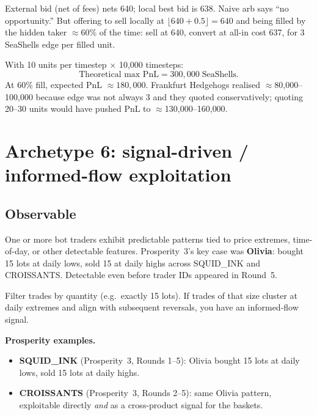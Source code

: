 \begin{prosperitybox}[title={MAGNIFICENT\_MACARONS profit arithmetic}]
External bid (net of fees) nets 640; local best bid is 638.  Naive
arb says ``no opportunity.''  But offering to sell locally at
$\lfloor 640 + 0.5 \rfloor = 640$ and being filled by the hidden
taker $\approx$60\% of the time: sell at 640, convert at all-in cost
637, for 3 SeaShells edge per filled unit.

With 10 units per timestep $\times$ 10{,}000 timesteps:
\[
  \text{Theoretical max PnL} = 300{,}000 \;\text{SeaShells.}
\]
At 60\% fill, expected PnL $\approx 180{,}000$.  Frankfurt Hedgehogs
realised $\approx$80{,}000--100{,}000 because edge was not always 3
and they quoted conservatively; quoting 20--30 units would have
pushed PnL to $\approx$130{,}000--160{,}000.
\end{prosperitybox}

\section{Archetype 6: signal-driven / informed-flow exploitation}
\label{sec:archetype_signal}

\subsection{Observable}

One or more bot traders exhibit predictable patterns tied to price
extremes, time-of-day, or other detectable features.  Prosperity~3's
key case was \textbf{Olivia}: bought 15 lots at daily lows, sold 15
at daily highs across SQUID\_INK and CROISSANTS.  Detectable even
before trader IDs appeared in Round~5.

\begin{keyfactbox}[Diagnostic]
Filter trades by quantity (e.g.\ exactly 15 lots).  If trades of
that size cluster at daily extremes and align with subsequent
reversals, you have an informed-flow signal.
\end{keyfactbox}

\noindent
\textbf{Prosperity examples.}
\begin{itemize}
  \item \textbf{SQUID\_INK} (Prosperity~3, Rounds 1--5): Olivia bought
  15 lots at daily lows, sold 15 lots at daily highs.
  \item \textbf{CROISSANTS} (Prosperity~3, Rounds 2--5): same Olivia
  pattern, exploitable directly \emph{and} as a cross-product signal
  for the baskets.
\end{itemize}

